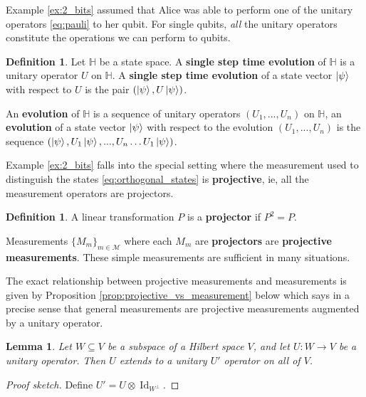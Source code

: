 \documentclass[12pt]{article}
\theoremstyle{plain}
\newtheorem{lemma}[thm]{Lemma}
\theoremstyle{definition}
\newtheorem{defn}[thm]{Definition} %
\newcommand{\bb}[1]{\mathbb{#1}}
\newcommand{\call}[1]{\mathcal{#1}}
\newcommand{\lto}{\longrightarrow}
\begin{document}
	Example \ref{ex:2_bits} assumed that Alice was able to perform one of the unitary operators \eqref{eq:pauli} to her qubit. For single qubits, \emph{all} the unitary operators constitute the operations we can perform to qubits.
	
	\begin{defn}\label{def:time_evolution}
		Let $\bb{H}$ be a state space. A \textbf{single step time evolution} of $\bb{H}$ is a unitary operator $U$ on $\bb{H}$. A \textbf{single step time evolution} of a state vector $\ket{\psi}$ with respect to $U$ is the pair $(\ket{\psi},U\ket{\psi})$.
		
		An \textbf{evolution} of $\bb{H}$ is a sequence of unitary operators $(U_1,...,U_n)$ on $\bb{H}$, an \textbf{evolution} of a state vector $\ket{\psi}$ with respect to the evolution $(U_1,...,U_n)$ is the sequence $(\ket{\psi},U_1\ket{\psi},...,U_n\hdots U_1\ket{\psi})$.
	\end{defn}
	
	Example \ref{ex:2_bits} falls into the special setting where the measurement used to distinguish the states \eqref{eq:orthogonal_states} is \textbf{projective}, ie, all the measurement operators are projectors.
	
	\begin{defn}
		A linear transformation $P$ is a \textbf{projector} if $P^2 = P$.
	\end{defn}
	
	Measurements $\{ M_m \}_{m \in \call{M}}$ where each $M_m$ are \textbf{projectors} are \textbf{projective measurements}. These simple measurements are sufficient in many situations.
	
	The exact relationship between projective measurements and measurements is given by Proposition \ref{prop:projective_vs_measurement} below which says in a precise sense that general measurements are projective measurements augmented by a unitary operator.
	
		\begin{lemma}\label{lem:unitary_extension}
		Let $W \subseteq V$ be a subspace of a Hilbert space $V$, and let $U: W \lto V$ be a unitary operator. Then $U$ extends to a unitary $U'$ operator on all of $V$.
	\end{lemma}
	\begin{proof}[Proof sketch]
		Define $U' = U\otimes \operatorname{Id}_{W^{\perp}}$.
	\end{proof}
	
\end{document}
